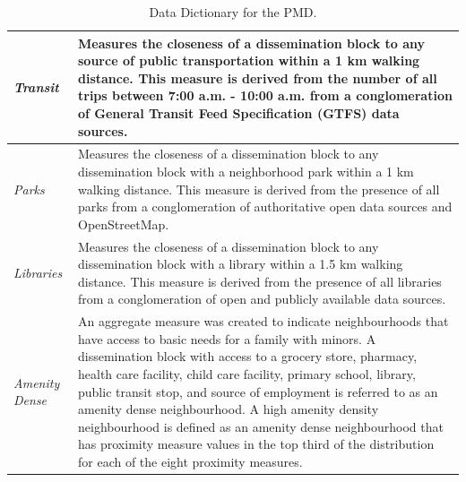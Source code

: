 \documentclass[11pt, a4paper]{article}
\begin{document}
\begin{table}[H]
{\begin{tabularx}{\textwidth}{|p{2cm}|X|}
\hline 
\textit{Transit} & Measures the closeness of a dissemination block to any source of public transportation within a 1 km walking distance. This measure is derived from the number of all trips between 7:00 a.m. - 10:00 a.m. from a conglomeration of General Transit Feed Specification (GTFS) data sources. \\ 
\hline 
\textit{Parks} & Measures the closeness of a dissemination block to any dissemination block with a neighborhood park within a 1 km walking distance. This measure is derived from the presence of all parks from a conglomeration of authoritative open data sources and OpenStreetMap. \\ 
\hline 
\textit{Libraries} & Measures the closeness of a dissemination block to any dissemination block with a library within a 1.5 km walking distance. This measure is derived from the presence of all libraries from a conglomeration of open and publicly available data sources. \\ 
\hline 
\textit{Amenity Dense} & An aggregate measure was created to indicate neighbourhoods that have access to basic needs for a family with minors. A dissemination block with access to a grocery store, pharmacy, health care facility, child care facility, primary school, library, public transit stop, and source of employment is referred to as an amenity dense neighbourhood. A high amenity density neighbourhood is defined as an amenity dense neighbourhood that has proximity measure values in the top third of the distribution for each of the eight proximity measures. \\ 
\hline 
\hline
\end{tabularx}
}
\caption[Data dictionary]{Data Dictionary for the PMD.}\label{datadictionary}
\end{table}
\end{document}
